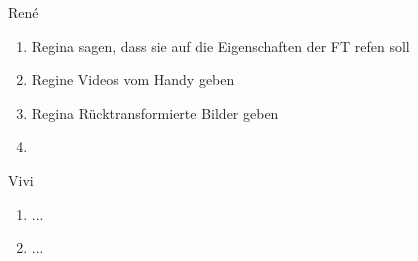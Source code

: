 
René
\begin{enumerate}
	\item Regina sagen, dass sie auf die Eigenschaften der FT refen soll
	\item Regine Videos vom Handy geben
	\item Regina Rücktransformierte Bilder geben
	\item 
\end{enumerate}

Vivi
\begin{enumerate}
	\item ...
	\item ...
\end{enumerate}